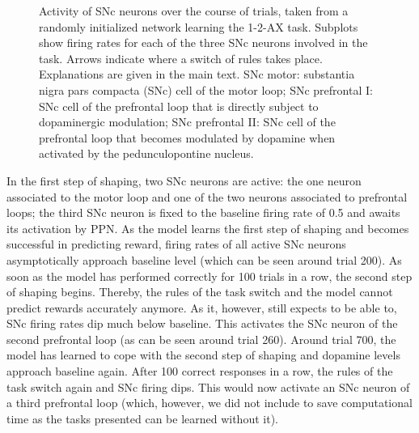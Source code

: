 \documentclass[
  11pt,
  a4paper,
]{scrbook}
\begin{document}
\begin{figure}


\caption{\label{fig-nn:fig8}Activity of SNc neurons over the course of
trials, taken from a randomly initialized network learning the 1-2-AX
task. Subplots show firing rates for each of the three SNc neurons
involved in the task. Arrows indicate where a switch of rules takes
place. Explanations are given in the main text. SNc motor: substantia
nigra pars compacta (SNc) cell of the motor loop; SNc prefrontal I: SNc
cell of the prefrontal loop that is directly subject to dopaminergic
modulation; SNc prefrontal II: SNc cell of the prefrontal loop that
becomes modulated by dopamine when activated by the pedunculopontine
nucleus.}

\end{figure}%

In the first step of shaping, two SNc neurons are active: the one neuron
associated to the motor loop and one of the two neurons associated to
prefrontal loops; the third SNc neuron is fixed to the baseline firing
rate of 0.5 and awaits its activation by PPN. As the model learns the
first step of shaping and becomes successful in predicting reward,
firing rates of all active SNc neurons asymptotically approach baseline
level (which can be seen around trial 200). As soon as the model has
performed correctly for 100 trials in a row, the second step of shaping
begins. Thereby, the rules of the task switch and the model cannot
predict rewards accurately anymore. As it, however, still expects to be
able to, SNc firing rates dip much below baseline. This activates the
SNc neuron of the second prefrontal loop (as can be seen around trial
260). Around trial 700, the model has learned to cope with the second
step of shaping and dopamine levels approach baseline again. After 100
correct responses in a row, the rules of the task switch again and SNc
firing dips. This would now activate an SNc neuron of a third prefrontal
loop (which, however, we did not include to save computational time as
the tasks presented can be learned without it).
\end{document}
